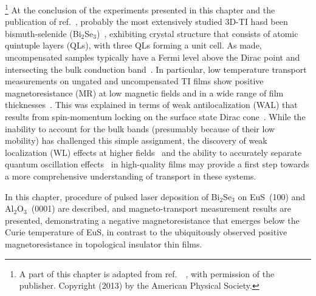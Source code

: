 \footnote[2]{A part of this chapter is adapted from ref.~\cite{bilayer2014}~, with permission of the publisher. Copyright (2013) by the American Physical Society.}%
%
At the conclusion of the experiments presented in this chapter and the publication of ref.~\cite{bilayer2014}, probably the most extensively studied 3D-TI hasd been bismuth-selenide (Bi$_2$Se$_3$)~\cite{TI_electronic_structure_zhang, Zhanybek3, TI_other1}, exhibiting crystal structure that consists of atomic quintuple layers (QLs), with three QLs forming a unit cell. As made, uncompensated samples typically have a Fermi level above the Dirac point and intersecting the bulk conduction band~\cite{TI_ARPES1, ARPES_thickness}. In particular, low temperature transport measurements on ungated and uncompensated TI films show positive magnetoresistance (MR) at low magnetic fields and in a wide range of film thicknesses~\cite{ TI_WAL_Hongkong, TI_WAL_thickness, zhangli2012}. This was explained in terms of weak antilocalization (WAL) that results from spin-momentum locking on the surface state Dirac cone~\cite{TI_WAL_Hongkong, bergmann1984}. While the inability to account for the bulk bands (presumably because of their low mobility) has challenged this simple assignment, the discovery of weak localization (WL) effects at higher fields~\cite{zhangli2013} and the ability to accurately separate quantum oscillation effects~\cite{Ando_PRL} in high-quality films may provide a first step towards a more comprehensive understanding of transport in these systems.

In this chapter, procedure of pulsed laser deposition of Bi$_2$Se$_3$ on EuS~(100) and Al$_2$O$_3$~(0001) are described, and magneto-transport measurement results are presented, demonstrating a negative magnetoresistance that emerges below the Curie temperature of EuS, in contrast to the ubiquitously observed positive magnetoresistance in topological insulator thin films.

